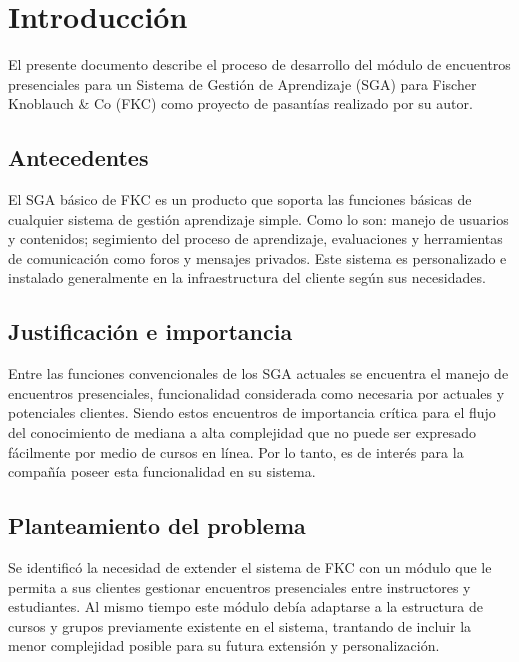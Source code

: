 \chapter*{Introducción}
\thispagestyle{empty} %
 
El presente documento describe el proceso de desarrollo del módulo de encuentros presenciales para un Sistema de Gestión de Aprendizaje (SGA) para Fischer Knoblauch \& Co (FKC) como proyecto de pasantías realizado por su autor.

\section*{Antecedentes}
El SGA básico de FKC es un producto que soporta las funciones básicas de cualquier sistema de gestión aprendizaje simple. Como lo son: manejo de usuarios y contenidos; segimiento del proceso de aprendizaje, evaluaciones y herramientas de comunicación como foros y mensajes privados. Este sistema es personalizado e instalado generalmente en la infraestructura del cliente según sus necesidades.

\section*{Justificación e importancia}
Entre las funciones convencionales de los SGA actuales se encuentra el manejo de encuentros presenciales, funcionalidad considerada como necesaria por actuales y potenciales clientes. Siendo estos encuentros de importancia crítica para el flujo del conocimiento de mediana a alta complejidad que no puede ser expresado fácilmente por medio de cursos en línea. Por lo tanto, es de interés para la compañía poseer esta funcionalidad en su sistema.


\section*{Planteamiento del problema}
Se identificó la necesidad de extender el sistema de FKC con un módulo que le permita a sus clientes gestionar encuentros presenciales entre instructores y estudiantes. Al mismo tiempo este módulo debía adaptarse a la estructura de cursos y grupos previamente existente en el sistema, trantando de incluir la menor complejidad posible para su futura extensión y personalización.

